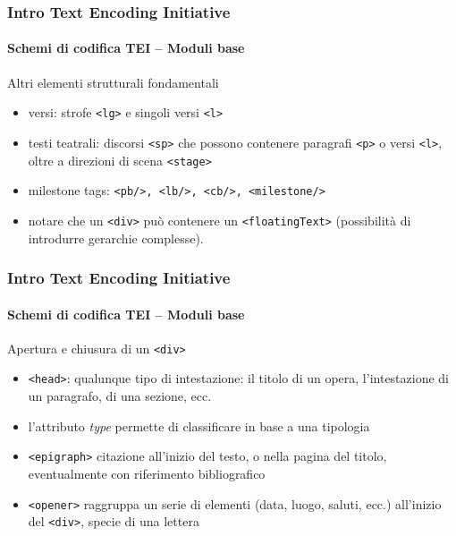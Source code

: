 \begin{frame}
	\frametitle{Intro Text Encoding Initiative}
	\framesubtitle{Schemi di codifica TEI – Moduli base}
	\addtocounter{nframe}{1}

	\begin{block}{Altri elementi strutturali fondamentali}
        \begin{itemize}
            \item versi: strofe \texttt{<lg>} e singoli versi \texttt{<l>}
            \item testi teatrali: discorsi \texttt{<sp>} che possono contenere paragrafi
            \texttt{<p>} o versi \texttt{<l>}, oltre a direzioni di scena \texttt{<stage>}
            \item milestone tags: \texttt{<pb/>, <lb/>, <cb/>, <milestone/>}
            \item notare che un \texttt{<div>} può contenere un \texttt{<floatingText>} (possibilità di introdurre gerarchie complesse).
        \end{itemize}
        
    \end{block}

\end{frame}

\begin{frame}
	\frametitle{Intro Text Encoding Initiative}
	\framesubtitle{Schemi di codifica TEI – Moduli base}
	\addtocounter{nframe}{1}

	\begin{block}{Apertura e chiusura di un \texttt{<div>}}
        \begin{itemize}
            \item \texttt{<head>}: qualunque tipo di intestazione: il titolo di un opera, l’intestazione di un paragrafo, di una sezione, ecc.
            \item l'attributo \textit{type} permette di classificare in base a una tipologia
            \item \texttt{<epigraph>} citazione all’inizio del testo, o nella pagina del titolo, eventualmente con riferimento bibliografico
            \item \texttt{<opener>} raggruppa un serie di elementi (data, luogo, saluti, ecc.) all’inizio del \texttt{<div>}, specie di una lettera
        \end{itemize}
    \end{block}

\end{frame}

